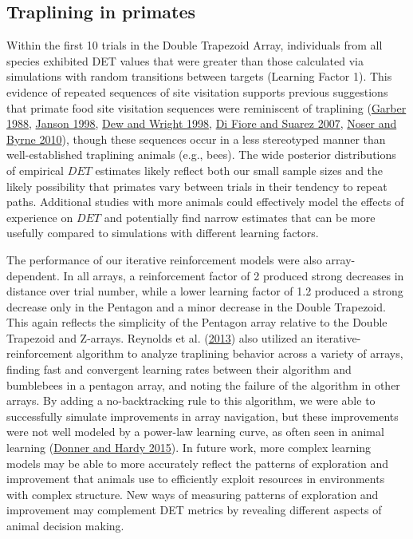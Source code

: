 \documentclass[twoside,12pt,final]{ucthesis-CA2012}
\begin{document}
\begin{ucmainmatter}
\hypertarget{traplining-in-primates}{%
\subsection{Traplining in primates}\label{traplining-in-primates}}

Within the first 10 trials in the Double Trapezoid Array, individuals from all species exhibited DET values that were greater than those calculated via simulations with random transitions between targets (Learning Factor 1). This evidence of repeated sequences of site visitation supports previous suggestions that primate food site visitation sequences were reminiscent of traplining (\protect\hyperlink{ref-garber1988}{Garber 1988}, \protect\hyperlink{ref-janson1998}{Janson 1998}, \protect\hyperlink{ref-dew1998}{Dew and Wright 1998}, \protect\hyperlink{ref-difiore2007}{Di Fiore and Suarez 2007}, \protect\hyperlink{ref-noser2010}{Noser and Byrne 2010}), though these sequences occur in a less stereotyped manner than well-established traplining animals (e.g., bees). The wide posterior distributions of empirical \(DET\) estimates likely reflect both our small sample sizes and the likely possibility that primates vary between trials in their tendency to repeat paths. Additional studies with more animals could effectively model the effects of experience on \(DET\) and potentially find narrow estimates that can be more usefully compared to simulations with different learning factors.

The performance of our iterative reinforcement models were also array-dependent. In all arrays, a reinforcement factor of 2 produced strong decreases in distance over trial number, while a lower learning factor of 1.2 produced a strong decrease only in the Pentagon and a minor decrease in the Double Trapezoid. This again reflects the simplicity of the Pentagon array relative to the Double Trapezoid and Z-arrays. Reynolds et al. (\protect\hyperlink{ref-reynolds2013}{2013}) also utilized an iterative-reinforcement algorithm to analyze traplining behavior across a variety of arrays, finding fast and convergent learning rates between their algorithm and bumblebees in a pentagon array, and noting the failure of the algorithm in other arrays. By adding a no-backtracking rule to this algorithm, we were able to successfully simulate improvements in array navigation, but these improvements were not well modeled by a power-law learning curve, as often seen in animal learning (\protect\hyperlink{ref-donner2015}{Donner and Hardy 2015}). In future work, more complex learning models may be able to more accurately reflect the patterns of exploration and improvement that animals use to efficiently exploit resources in environments with complex structure. New ways of measuring patterns of exploration and improvement may complement DET metrics by revealing different aspects of animal decision making.


\end{ucmainmatter}
\end{document}
